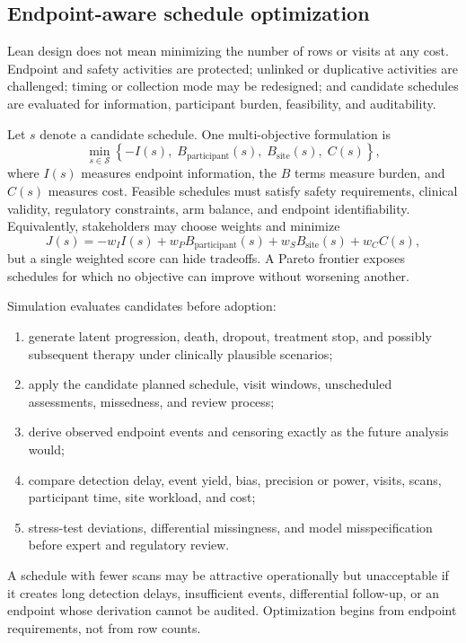 \documentclass[12pt,oneside]{book}
\numberwithin{equation}{section}
\theoremstyle{definition}
\theoremstyle{plain}
\theoremstyle{remark}
\begin{document}
\subsection{Endpoint-aware schedule optimization}

Lean design does not mean minimizing the number of rows or visits at any cost.
Endpoint and safety activities are protected; unlinked or duplicative
activities are challenged; timing or collection mode may be redesigned; and
candidate schedules are evaluated for information, participant burden,
feasibility, and auditability.

Let $s$ denote a candidate schedule.  One multi-objective formulation is
\[
  \min_{s\in\mathcal S}
  \left\{
      -I(s),\; B_{\mathrm{participant}}(s),\;
      B_{\mathrm{site}}(s),\; C(s)
  \right\},
\]
where $I(s)$ measures endpoint information, the $B$ terms measure burden, and
$C(s)$ measures cost.  Feasible schedules must satisfy safety requirements,
clinical validity, regulatory constraints, arm balance, and endpoint
identifiability.  Equivalently, stakeholders may choose weights and minimize
\[
  J(s)=-w_I I(s)+w_PB_{\mathrm{participant}}(s)
       +w_SB_{\mathrm{site}}(s)+w_C C(s),
\]
but a single weighted score can hide tradeoffs.  A Pareto frontier exposes
schedules for which no objective can improve without worsening another.

Simulation evaluates candidates before adoption:
\begin{enumerate}
    \item generate latent progression, death, dropout, treatment stop, and
    possibly subsequent therapy under clinically plausible scenarios;
    \item apply the candidate planned schedule, visit windows, unscheduled
    assessments, missedness, and review process;
    \item derive observed endpoint events and censoring exactly as the future
    analysis would;
    \item compare detection delay, event yield, bias, precision or power,
    visits, scans, participant time, site workload, and cost;
    \item stress-test deviations, differential missingness, and model
    misspecification before expert and regulatory review.
\end{enumerate}
A schedule with fewer scans may be attractive operationally but unacceptable if
it creates long detection delays, insufficient events, differential follow-up,
or an endpoint whose derivation cannot be audited.  Optimization begins from
endpoint requirements, not from row counts.
\end{document}
